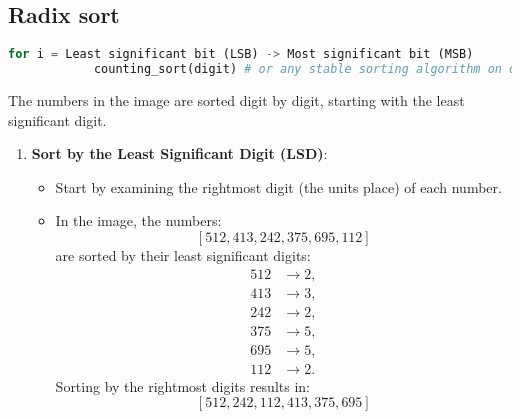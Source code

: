 \subsection{Radix sort}
\begin{definition}
    \begin{lstlisting}[language=Python, caption={Radix Sort Pseudocode}]
        for i = Least significant bit (LSB) -> Most significant bit (MSB)
            counting_sort(digit) # or any stable sorting algorithm on digit i
    \end{lstlisting}
\end{definition}

\begin{example}
    The numbers in the image are sorted digit by digit, starting with the least significant digit. 

    \begin{enumerate}
        \item \textbf{Sort by the Least Significant Digit (LSD)}:
        \begin{itemize}
            \item Start by examining the rightmost digit (the units place) of each number.
            \item In the image, the numbers:
            \[
            [512, 413, 242, 375, 695, 112]
            \]
            are sorted by their least significant digits:
            \begin{align*}
            512 & \rightarrow 2, \\
            413 & \rightarrow 3, \\
            242 & \rightarrow 2, \\
            375 & \rightarrow 5, \\
            695 & \rightarrow 5, \\
            112 & \rightarrow 2.
            \end{align*}
            Sorting by the rightmost digits results in:
            \[
            [512, 242, 112, 413, 375, 695]
            \]
        \end{itemize}
        

\end{enumerate}
\end{example}
